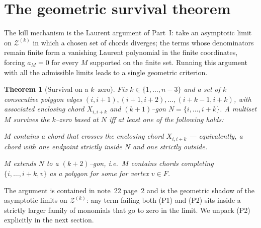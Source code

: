 \documentclass[11pt]{article}
\newtheorem{theorem}{Theorem}
\theoremstyle{definition}
\newcommand{\Z}{\mathcal{Z}}
\newcommand{\X}[1]{X_{#1}}
\begin{document}
\section{The geometric survival theorem}\label{sec:survival}
The kill mechanism is the Laurent argument of Part~I: take an asymptotic limit on
$\Z^{(k)}$ in which a chosen set of chords diverges; the terms whose denominators
remain finite form a vanishing Laurent polynomial in the finite coordinates, forcing
$a_M=0$ for every $M$ supported on the finite set. Running this argument with all the
admissible limits leads to a single geometric criterion.

\begin{theorem}[Survival on a $k$--zero]\label{thm:survival}
Fix $k\in\{1,\dots,n{-}3\}$ and a set of $k$ consecutive polygon edges
$(i,i{+}1),(i{+}1,i{+}2),\dots,(i{+}k{-}1,i{+}k)$, with associated enclosing chord
$\X{i,i+k}$ and $(k{+}1)$--gon $N=\{i,\dots,i{+}k\}$. A multiset $M$ survives the
$k$--zero based at $N$ iff at least one of the following holds:
\begin{description}[topsep=2pt,itemsep=2pt,leftmargin=2.4em]
  \item[\textnormal{(P1)}] $M$ contains a chord that crosses the enclosing chord
  $\X{i,i+k}$ --- equivalently, a chord with one endpoint strictly inside $N$ and one
  strictly outside.
  \item[\textnormal{(P2)}] $M$ extends $N$ to a $(k{+}2)$--gon, i.e.\ $M$ contains
  chords completing $\{i,\dots,i{+}k,v\}$ as a polygon for some far vertex
  $v\in F$.
\end{description}
\end{theorem}

\noindent The argument is contained in note~22 page~2 and is the geometric shadow of
the asymptotic limits on $\Z^{(k)}$: any term failing both (P1) and (P2) sits inside
a strictly larger family of monomials that go to zero in the limit. We unpack (P2)
explicitly in the next section.
\end{document}
